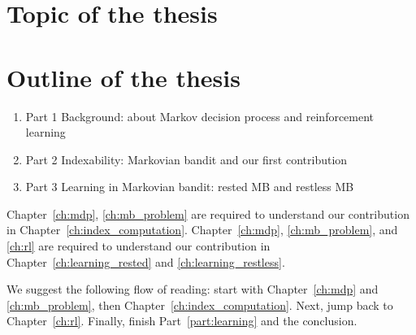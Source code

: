 \section{Topic of the thesis}

\section{Outline of the thesis}

\begin{enumerate}
    \item Part 1 Background: about Markov decision process and reinforcement learning
    \item Part 2 Indexability: Markovian bandit and our first contribution
    \item Part 3 Learning in Markovian bandit: rested MB and restless MB
\end{enumerate}

Chapter~\ref{ch:mdp}, \ref{ch:mb_problem} are required to understand our contribution in Chapter~\ref{ch:index_computation}.
Chapter~\ref{ch:mdp}, \ref{ch:mb_problem}, and \ref{ch:rl} are required to understand our contribution in Chapter~\ref{ch:learning_rested} and \ref{ch:learning_restless}.

We suggest the following flow of reading: start with Chapter~\ref{ch:mdp} and \ref{ch:mb_problem}, then Chapter~\ref{ch:index_computation}. Next, jump back to Chapter~\ref{ch:rl}. Finally, finish Part~\ref{part:learning} and the conclusion.

%
